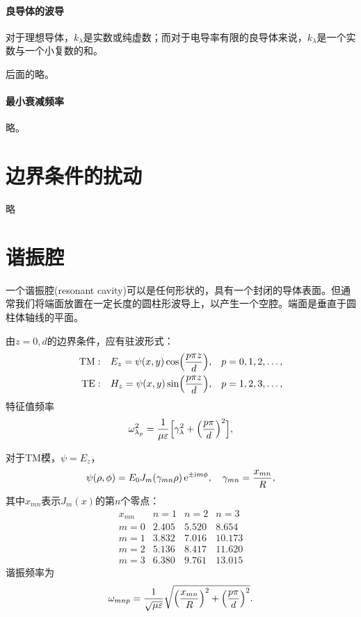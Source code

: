 \paragraph{良导体的波导}
对于理想导体，$k_\lambda$是实数或纯虚数；而对于电导率有限的良导体来说，$k_\lambda$是一个实数与一个小复数的和。

后面的略。
\paragraph{最小衰减频率}
略。
\section{边界条件的扰动}
略
\section{谐振腔}
一个谐振腔(resonant cavity)可以是任何形状的，具有一个封闭的导体表面。但通常我们将端面放置在一定长度的圆柱形波导上，以产生一个空腔。端面是垂直于圆柱体轴线的平面。

由$z=0,d$的边界条件，应有驻波形式：
\begin{align*}
    \text{TM}&:&E_z=\psi(x,y)\cos\Bigl(\frac{p\pi z}d\Bigr),&&p&=0,1,2,\ldots,\\
    \text{TE}&:&H_z=\psi(x,y)\sin\Bigl(\frac{p\pi z}d\Bigr),&&p&=1,2,3,\ldots,
\end{align*}
特征值频率
\[
    \omega_{\lambda_p}^2=\frac1{\mu\varepsilon}\Bigl[\gamma_\lambda^2+\Bigl(\frac{p\pi}d\Bigr)^2\Bigr],
\]

对于TM模，$\psi=E_z$，
\[
    \psi(\rho,\phi)=E_0J_m(\gamma_{mn}\rho)\mathop{}\!\mathrm{e}^{\pm\mathrm{i} m\phi},\quad\gamma_{mn}=\frac{x_{mn}}R,
\]
其中$x_{mn}$表示$J_m(x)$的第$n$个零点：
\begin{equation}
    \begin{matrix}
        x_{mn}&n=1&n=2&n=3\\
        m=0&2.405&5.520&8.654\\
        m=1&3.832&7.016&10.173\\
        m=2&5.136&8.417&11.620\\
        m=3&6.380&9.761&13.015
    \end{matrix}
\end{equation}
谐振频率为
\begin{equation}
    \omega_{mnp}=\frac1{\sqrt{\mu\varepsilon}}\sqrt{\Bigl(\frac{x_{mn}}R\Bigr)^2+\Bigl(\frac{p\pi}d\Bigr)^2}.
\end{equation}

